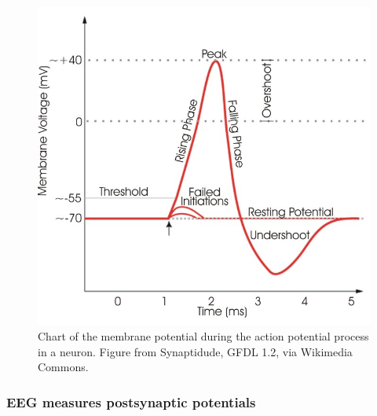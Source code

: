 \begin{figure}[ht]
    \centering
    \includegraphics[width=0.7\linewidth]{../images/biosignals/action_potential.jpg}
    \captionsetup{width=0.7\linewidth}
    \captionsetup{justification=centering}
    \caption{Chart of the membrane potential during the action potential process in a neuron. Figure from Synaptidude, GFDL 1.2, via Wikimedia Commons.} 
    \label{fig:biomedical_signals_action_potential}
\end{figure}




\subsubsection{EEG measures postsynaptic potentials}
\label{subsubsec:biomedical_signals_biosignals_electrical_postsynaptic_potential}

